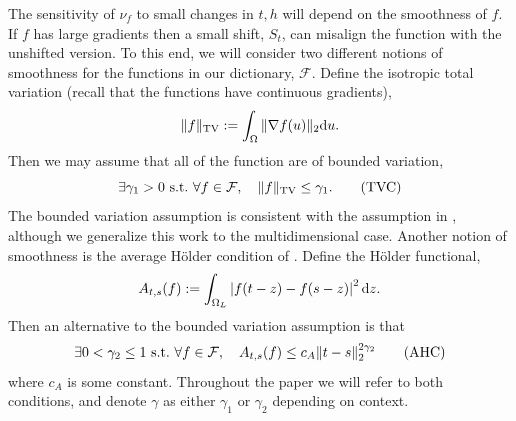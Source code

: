 The sensitivity of $\nu_f$ to small changes in $t,h$ will depend on the smoothness of $f$.
If $f$ has large gradients then a small shift, $S_t$, can misalign the function with the unshifted version.
To this end, we will consider two different notions of smoothness for the functions in our dictionary, $\mathcal F$.
Define the isotropic total variation (recall that the functions have continuous gradients),
$$
\| f \|_{\rm TV} := \int_\Omega \| \nabla f(u) \|_2 {\rm d} u.
$$
Then we may assume that all of the function are of bounded variation,
\begin{equation}
    \label{eq:TVC}
    \exists \gamma_1 > 0 {\rm ~s.t.~} \forall f \in \mathcal F, \quad \| f \|_{\rm TV} \le \gamma_1. \tag{TVC}
\end{equation}
The bounded variation assumption is consistent with the assumption in \cite{dumbgen2001multiscale}, although we generalize this work to the multidimensional case.
Another notion of smoothness is the average H\"older condition of \cite{proksch2016multiscale}.
Define the H\"older functional,
$$
A_{t,s}(f) := \int_{\Omega_L} \left|f(t-z) - f(s-z) \right|^2 {\rm d} z.
$$
Then an alternative to the bounded variation assumption is that
\begin{equation}
    \label{eq:AHC}
    \exists 0 < \gamma_2 \le 1 {\rm ~s.t.~} \forall f \in \mathcal F,\quad A_{t,s}(f) \le c_A \| t-s\|_2^{2 \gamma_2} \tag{AHC}
\end{equation}
where $c_A$ is some constant.  Throughout the paper we will refer to both conditions, and denote $\gamma$ as either $\gamma_1$ or $\gamma_2$ depending on context.

